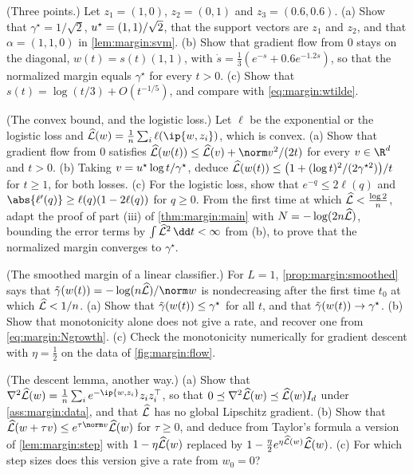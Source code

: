 \begin{refsection}
\begin{exercises}
\item \consolidation (Three points.) Let $z_1=(1,0)$, $z_2=(0,1)$ and $z_3=(0.6,0.6)$. (a) Show that $\gamma^\star=1/\sqrt2$, $u^\star=(1,1)/\sqrt2$, that the support vectors are $z_1$ and $z_2$, and that $\alpha=(1,1,0)$ in \cref{lem:margin:svm}. (b) Show that gradient flow from $0$ stays on the diagonal, $w(t)=s(t)(1,1)$, with $\dot s=\frac13(e^{-s}+0.6e^{-1.2s})$, so that the normalized margin equals $\gamma^\star$ for every $t>0$. (c) Show that $s(t)=\log(t/3)+O(t^{-1/5})$, and compare with \eqref{eq:margin:wtilde}. \label{ex:margin:three}

\item \consolidation (The convex bound, and the logistic loss.) Let $\ell$ be the exponential or the logistic loss and $\Lhat(w)=\frac1n\sum_i\ell(\ip{w,z_i})$, which is convex. (a) Show that gradient flow from $0$ satisfies $\Lhat(w(t))\le\Lhat(v)+\norm v^2/(2t)$ for every $v\in\R^d$ and $t>0$.  (b) Taking $v=u^\star\log t/\gamma^\star$, deduce $\widehat{\mathcal{L}}(w(t))\le\bigl(1+(\log t)^2/(2\gamma^{\star2})\bigr)/t$ for $t\ge1$, for both losses. (c) For the logistic loss, show that $e^{-q}\le2\ell(q)$ and $\abs{\ell'(q)}\ge\ell(q)(1-2\ell(q))$ for $q\ge0$. From the first time at which $\widehat{\mathcal{L}}<\frac{\log2}n$, adapt the proof of part (iii) of \cref{thm:margin:main} with $N=-\log(2n\widehat{\mathcal{L}})$, bounding the error terms by $\int\Lhat^2\,\dd t<\infty$ from (b), to prove that the normalized margin converges to $\gamma^\star$. \label{ex:margin:logistic}

\item \consolidation (The smoothed margin of a linear classifier.) For $L=1$, \cref{prop:margin:smoothed} says that $\marginsm(w(t))=-\log(n\Lhat)/\norm w$ is nondecreasing after the first time $t_0$ at which $\widehat{\mathcal{L}}<1/n$. (a) Show that $\tilde\gamma(w(t))\le\gamma^\star$ for all $t$, and that $\tilde\gamma(w(t))\to\gamma^\star$. (b) Show that monotonicity alone does not give a rate, and recover one from \eqref{eq:margin:Ngrowth}. (c) Check the monotonicity numerically for gradient descent with $\eta=\frac12$ on the data of \cref{fig:margin:flow}. \label{ex:margin:linearsm}

\item \consolidation (The descent lemma, another way.) (a) Show that $\nabla^2\Lhat(w)=\frac1n\sum_ie^{-\ip{w,z_i}}z_iz_i^\top$, so that $0\preceq\nabla^2\widehat{\mathcal{L}}(w)\preceq\widehat{\mathcal{L}}(w)I_d$ under \cref{ass:margin:data}, and that $\widehat{\mathcal{L}}$ has no global Lipschitz gradient. (b) Show that $\Lhat(w+\tau v)\le e^{\tau\norm v}\Lhat(w)$ for $\tau\ge0$, and deduce from Taylor's formula a version of \cref{lem:margin:step} with $1-\eta\widehat{\mathcal{L}}(w)$ replaced by $1-\frac\eta2e^{\eta\widehat{\mathcal{L}}(w)}\widehat{\mathcal{L}}(w)$. (c) For which step sizes does this version give a rate from $w_0=0$? \label{ex:margin:hessian}


\end{exercises}
\end{refsection}

